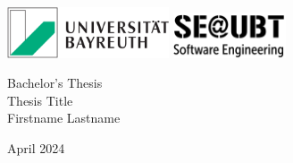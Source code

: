 \documentclass[
	pdftex,
	12pt,
	a4paper,
	parskip=relative,
	twoside,
	footinclude=false,
	footheight=0mm,
	toc=bibliography,
	toc=listof
]{scrbook}
\theoremstyle{definitiontight}
\newcommand{\thesistype}{Bachelor's Thesis} %
\newcommand{\thesistitle}{Thesis Title}
\newcommand{\studentname}{Firstname Lastname}
\newcommand{\monthyear}{April 2024}
\begin{document}

\frontmatter %

\begin{titlepage}

	\begin{center}
		\includegraphics[height=1.5cm]{figures/logos/logo-ubt.png}	
		\hfill
		\includegraphics[height=1.35cm]{figures/logos/logo-se-ubt.png}	
	\end{center}
	
	\vspace{4cm}
	
	\begin{center}
		{\large \thesistype}\\
		\vspace{0.5cm}
		{\LARGE\textsf{\thesistitle}}\\
		\vspace{1cm}
		{\large \studentname}\\
	\end{center}

	\vfill
		
	\begin{center}
		{\large \monthyear}
	\end{center}

\end{titlepage}

\newpage
\thispagestyle{empty}
\mbox{}
\newpage
\end{document}
